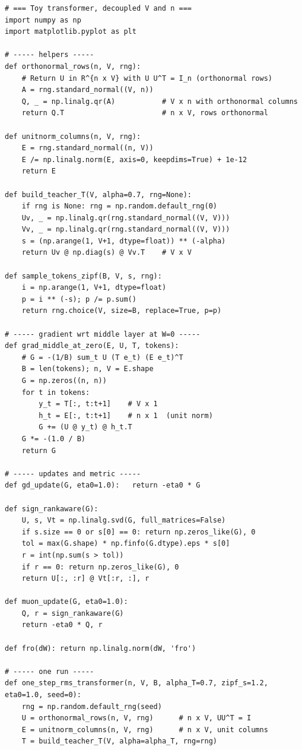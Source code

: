 \documentclass[11pt]{article}
\theoremstyle{definition}
\begin{document}
\begin{lstlisting}
# === Toy transformer, decoupled V and n ===
import numpy as np
import matplotlib.pyplot as plt

# ----- helpers -----
def orthonormal_rows(n, V, rng):
    # Return U in R^{n x V} with U U^T = I_n (orthonormal rows)
    A = rng.standard_normal((V, n))
    Q, _ = np.linalg.qr(A)           # V x n with orthonormal columns
    return Q.T                       # n x V, rows orthonormal

def unitnorm_columns(n, V, rng):
    E = rng.standard_normal((n, V))
    E /= np.linalg.norm(E, axis=0, keepdims=True) + 1e-12
    return E

def build_teacher_T(V, alpha=0.7, rng=None):
    if rng is None: rng = np.random.default_rng(0)
    Uv, _ = np.linalg.qr(rng.standard_normal((V, V)))
    Vv, _ = np.linalg.qr(rng.standard_normal((V, V)))
    s = (np.arange(1, V+1, dtype=float)) ** (-alpha)
    return Uv @ np.diag(s) @ Vv.T    # V x V

def sample_tokens_zipf(B, V, s, rng):
    i = np.arange(1, V+1, dtype=float)
    p = i ** (-s); p /= p.sum()
    return rng.choice(V, size=B, replace=True, p=p)

# ----- gradient wrt middle layer at W=0 -----
def grad_middle_at_zero(E, U, T, tokens):
    # G = -(1/B) sum_t U (T e_t) (E e_t)^T
    B = len(tokens); n, V = E.shape
    G = np.zeros((n, n))
    for t in tokens:
        y_t = T[:, t:t+1]    # V x 1
        h_t = E[:, t:t+1]    # n x 1  (unit norm)
        G += (U @ y_t) @ h_t.T
    G *= -(1.0 / B)
    return G

# ----- updates and metric -----
def gd_update(G, eta0=1.0):   return -eta0 * G

def sign_rankaware(G):
    U, s, Vt = np.linalg.svd(G, full_matrices=False)
    if s.size == 0 or s[0] == 0: return np.zeros_like(G), 0
    tol = max(G.shape) * np.finfo(G.dtype).eps * s[0]
    r = int(np.sum(s > tol))
    if r == 0: return np.zeros_like(G), 0
    return U[:, :r] @ Vt[:r, :], r

def muon_update(G, eta0=1.0):
    Q, r = sign_rankaware(G)
    return -eta0 * Q, r

def fro(dW): return np.linalg.norm(dW, 'fro')

# ----- one run -----
def one_step_rms_transformer(n, V, B, alpha_T=0.7, zipf_s=1.2, eta0=1.0, seed=0):
    rng = np.random.default_rng(seed)
    U = orthonormal_rows(n, V, rng)      # n x V, UU^T = I
    E = unitnorm_columns(n, V, rng)      # n x V, unit columns
    T = build_teacher_T(V, alpha=alpha_T, rng=rng)


\end{lstlisting}
\end{document}
